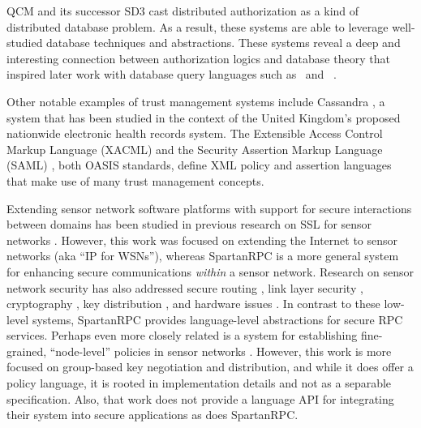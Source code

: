 QCM \cite{Gunter:DALSI,Gunter:GCR} and its successor SD3 \cite{Jim:STMSCE,Jim:DDQE} cast
distributed authorization as a kind of distributed database problem. As a result, these systems
are able to leverage well-studied database techniques and abstractions. These systems reveal a
deep and interesting connection between authorization logics and database theory that inspired
later work with database query languages such as \datalog\ and \datalogc\ \cite{Li:DCFTML}.

Other notable examples of trust management systems include Cassandra \cite{Becker:CFTMAEHR}, a
system that has been studied in the context of the United Kingdom's proposed nationwide
electronic health records system. The Extensible Access Control Markup Language (XACML)
\cite{OASIS:XACMLTC} and the Security Assertion Markup Language (SAML) \cite{OASIS:SSTC}, both
OASIS standards, define XML policy and assertion languages that make use of many trust
management concepts.


Extending sensor network software platforms with support for secure interactions between domains
has been studied in previous research on SSL for sensor networks \cite{10.1109/WAINA.2009.47}.
However, this work was focused on extending the Internet to sensor networks (aka ``IP for
WSNs''), whereas SpartanRPC is a more general system for enhancing secure communications
\emph{within} a sensor network. Research on sensor network security has also addressed secure
routing \cite{senroute-ahnj03}, link layer security \cite{karlog-tinysec-2004}, cryptography
\cite{bertoni-2006}, key distribution \cite{camtepe-bulent-05}, and hardware issues
\cite{perrig-2004}. In contrast to these low-level systems, SpartanRPC provides language-level
abstractions for secure RPC services. Perhaps even more closely related is a system for
establishing fine-grained, ``node-level'' policies in sensor networks
\cite{Claycomb:2011:NNL:1889383.1889450}. However, this work is more focused on group-based key
negotiation and distribution, and while it does offer a policy language, it is rooted in
implementation details and not as a separable specification. Also, that work does not provide a
language API for integrating their system into secure applications as does SpartanRPC.

